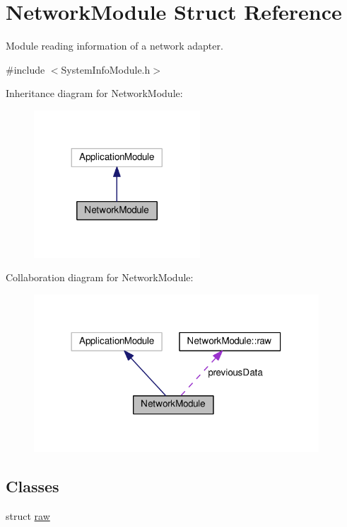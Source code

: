 \hypertarget{structNetworkModule}{}\section{Network\+Module Struct Reference}
\label{structNetworkModule}


Module reading information of a network adapter.  




{\ttfamily \#include $<$System\+Info\+Module.\+h$>$}



Inheritance diagram for Network\+Module\+:
\nopagebreak
\begin{figure}[H]
\begin{center}
\leavevmode
\includegraphics[width=176pt]{structNetworkModule__inherit__graph}
\end{center}
\end{figure}


Collaboration diagram for Network\+Module\+:
\nopagebreak
\begin{figure}[H]
\begin{center}
\leavevmode
\includegraphics[width=302pt]{structNetworkModule__coll__graph}
\end{center}
\end{figure}
\subsection*{Classes}
\begin{DoxyCompactItemize}
\item 
struct \hyperlink{structNetworkModule_1_1raw}{raw}
\end{DoxyCompactItemize}
